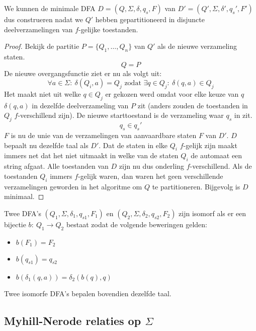 \documentclass[main.tex]{subfiles}
\begin{document}
\begin{gev}
  We kunnen de minimale DFA $D = (Q,\Sigma,\delta,q_{s},F)$ van $D' = (Q',\Sigma,\delta',q_{s}',F')$ dus construeren nadat we $Q'$ hebben gepartitioneerd in disjuncte deelverzamelingen van $f$-gelijke toestanden.

  \begin{proof}
    Bekijk de partitie $P = \{Q_{1},\dotsc,Q_{n}\}$ van $Q'$ als de nieuwe verzameling staten.
    \[ Q = P \]
    De nieuwe overgangsfunctie ziet er nu als volgt uit:
    \[ \forall a \in \Sigma:\ \delta(Q_{i},a) = Q_{j} \text{ zodat } \exists q \in Q_{j}:\ \delta(q,a) \in Q_{j} \]
    Het maakt niet uit welke $q\in Q_{j}$ er gekozen werd omdat voor elke keuze van $q$ $\delta(q,a)$ in dezelfde deelverzameling van $P$ zit (anders zouden de toestanden in $Q_{j}$ $f$-verschillend zijn).
    De nieuwe starttoestand is de verzameling waar $q_{s}$ in zit.
    \[ q_{s} \in q_{s}'\]
    $F$ is nu de unie van de verzamelingen van aanvaardbare staten $F$ van $D'$.
    $D$ bepaalt nu dezelfde taal als $D'$.
    Dat de staten in elke $Q_{i}$ $f$-gelijk zijn maakt immers net dat het niet uitmaakt in welke van de staten $Q_{i}$ de automaat een string afgaat.
    Alle toestanden van $D$ zijn nu dus onderling $f$-verschillend.
    Als de toestanden $Q_{i}$ immers $f$-gelijk waren, dan waren het geen verschillende verzamelingen geworden in het algoritme om $Q$ te partitioneren.
    Bijgevolg is $D$ minimaal.
  \end{proof}
\end{gev}

\begin{de}
  Twee DFA's $(Q_{1},\Sigma,\delta_{1},q_{s1},F_{1})$ en $(Q_{2},\Sigma,\delta_{2},q_{s2},F_{2})$ zijn isomorf als er een bijectie $b:\ Q_{1} \rightarrow Q_{2}$ bestaat zodat de volgende beweringen gelden:
  \begin{itemize}
  \item $b(F_{1}) = F_{2}$
  \item $b(q_{s1}) = q_{s2}$
  \item $b(\delta_{1}(q,a)) = \delta_{2}(b(q),q)$
  \end{itemize}
  Twee isomorfe DFA's bepalen bovendien dezelfde taal.
\end{de}


\subsection{Myhill-Nerode relaties op $\Sigma$}
\label{sec:myhill-nerode-relaties}
\end{document}
